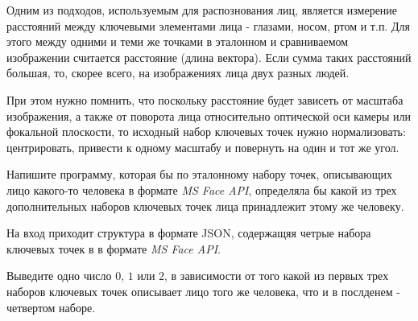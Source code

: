 
Одним из подходов, используемым для распознования лиц, является измерение расстояний между ключевыми элементами лица - глазами, носом, ртом и т.п. Для этого между одними и теми же точками в эталонном и сравниваемом изображении считается расстояние (длина вектора). Если сумма таких расстояний большая, то, скорее всего, на изображениях лица двух разных людей. 

При этом нужно помнить, что поскольку расстояние будет зависеть от масштаба изображения, а также от поворота лица относительно оптической оси камеры или фокальной плоскости, то исходный набор ключевых точек нужно нормализовать: центрировать, привести к одному масштабу и повернуть на один и тот же угол.

Напишите программу, которая бы по эталонному набору точек, описывающих лицо какого-то человека в формате \textit{MS Face API}, определяла бы какой из трех дополнительных наборов ключевых точек лица принадлежит этому же человеку.


На вход приходит структура в формате JSON, содержащяя четрые набора ключевых точек в в формате \textit{MS Face API}.

\outputfmtSection

Выведите одно число $0$, $1$ или $2$, в зависимости от того какой из первых трех наборов ключевых точек описывает лицо того же человека, что и в послденем - четвертом наборе.

\exampleSection


